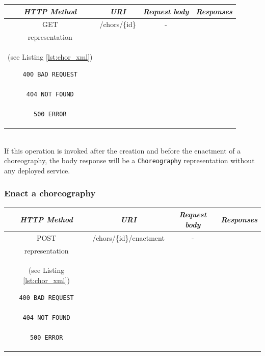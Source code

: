 \documentclass[a4paper, 10pt]{article}
\begin{document}
\begin{tabular}{|c|c|c|c|}
\hline 
\itshape{HTTP Method} & \itshape{URI} & \itshape{Request body} & \itshape{Responses} \\ 
\hline 
GET & /chors/\{id\} & - &
\begin{minipage}{2in}
\begin{verbatim}

200 OK
location = "/chors/{id}"

Body: 
\end{verbatim}
\verb!Choreography! XML \\
representation \\
(see Listing \ref{lst:chor_xml})
\begin{verbatim}
400 BAD REQUEST

404 NOT FOUND

500 ERROR

\end{verbatim}
\end{minipage} 
\\ 
\hline 
\end{tabular} \\

If this operation is invoked after the creation and before the enactment of a choreography, the body response will be a \verb!Choreography! representation without any deployed service.

\subsubsection*{Enact a choreography}

\begin{tabular}{|c|c|c|c|}
\hline 
\itshape{HTTP Method} & \itshape{URI} & \itshape{Request body} & \itshape{Responses} \\ 
\hline 
POST & /chors/\{id\}/enactment & - &
\begin{minipage}{2in}
\begin{verbatim}

200 OK
location = "/chors/{id}"
Body: 
\end{verbatim}
\verb!Choreography! XML \\
representation \\
(see Listing \ref{lst:chor_xml})
\begin{verbatim}
400 BAD REQUEST

404 NOT FOUND

500 ERROR

\end{verbatim}
\end{minipage} 
\\ 
\hline 
\end{tabular} \\
\end{document}
